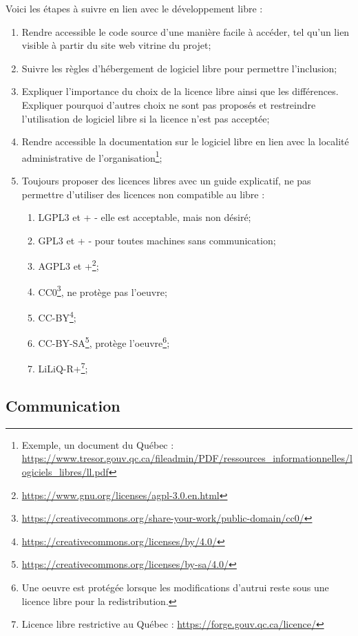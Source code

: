 Voici les étapes à suivre en lien avec le développement libre :
\begin{enumerate}
    \item Rendre accessible le code source d'une manière facile à accéder, tel qu'un lien visible à partir du site web vitrine du projet;
    \item Suivre les règles d'hébergement de logiciel libre pour permettre l'inclusion;
    \item Expliquer l'importance du choix de la licence libre ainsi que les différences. Expliquer pourquoi d'autres choix ne sont pas proposés et restreindre l'utilisation de logiciel libre si la licence n'est pas acceptée;
    \item Rendre accessible la documentation sur le logiciel libre en lien avec la localité administrative de l'organisation\footnote{Exemple, un document du Québec : \url{https://www.tresor.gouv.qc.ca/fileadmin/PDF/ressources_informationnelles/logiciels_libres/ll.pdf}};
    \item Toujours proposer des licences libres avec un guide explicatif, ne pas permettre d'utiliser des licences non compatible au libre :
    \begin{enumerate}
        \item LGPL3 et + - elle est acceptable, mais non désiré;
        \item GPL3 et + - pour toutes machines sans communication;
        \item AGPL3 et +\footnote{\url{https://www.gnu.org/licenses/agpl-3.0.en.html}};
        \item CC0\footnote{\url{https://creativecommons.org/share-your-work/public-domain/cc0/}}, ne protège pas l'oeuvre;
        \item CC-BY\footnote{\url{https://creativecommons.org/licenses/by/4.0/}};
        \item CC-BY-SA\footnote{\url{https://creativecommons.org/licenses/by-sa/4.0/}}, protège l'oeuvre\footnote{Une oeuvre est protégée lorsque les modifications d'autrui reste sous une licence libre pour la redistribution.};
        \item LiLiQ-R+\footnote{Licence libre restrictive au Québec : \url{https://forge.gouv.qc.ca/licence/}};
    \end{enumerate}
\end{enumerate}

\subsection{Communication}

